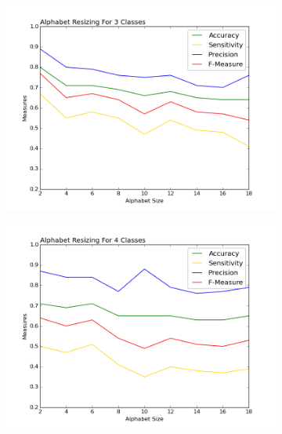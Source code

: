 \documentclass{mini}
\begin{document}
\begin{figure}
\begin{subfigure}{.5\textwidth}
  \label{fig:sfig2}
\end{subfigure}
\begin{subfigure}{.5\textwidth}
  \centering
  \includegraphics[width=1\linewidth]{images/a_c3_fig.png}
  \label{fig:sfig1}
\end{subfigure}%
\begin{subfigure}{.5\textwidth}
  \centering
  \includegraphics[width=1\linewidth]{images/a_c4_fig.png}
  \label{fig:sfig2}
\end{subfigure}
\begin{subfigure}{.5\textwidth}
  \centering

\end{subfigure}
\end{figure}
\end{document}
